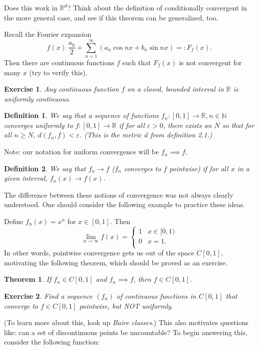 \documentclass{article}
\newtheorem{thm}{Theorem}[section]
\newtheorem{defn}{Definition}[section]
\newtheorem{exer}{Exercise}[section]
\begin{document}
Does this work in $\mathbb{R}^d$? Think about the definition of conditionally convergent in the more general case, and see if this theorem can be generalized, too. 

Recall the Fourier expansion
\begin{equation}
    f(x) ~ \frac{a_{0}}{2} + \sum_{n=1}^{\infty} (a_{n}\cos nx + b_{n}\sin nx) =: F_{f}(x).
\end{equation}
Then there are continuous functions $f$ such that $F_{f}(x)$ is not convergent for many $x$ (try to verify this). 

\begin{exer}
Any continuous function $f$ on a closed, bounded interval in $\mathbb{R}$ is uniformly continuous.
\end{exer}

\begin{defn}
We say that a sequence of functions $f_{n} : [0,1] \to \mathbb{R}, n \in \mathbb{N}$ converges uniformly to $f : [0,1] \to \mathbb{R}$ if for all $\varepsilon > 0$, there exists an $N$ so that for all $n \geq N$, $d(f_{n}, f) < \varepsilon$. (This is the metric $d$ from definition 2.1.)
\end{defn}
Note: our notation for uniform convergence will be $f_{n} \implies f$. 

\begin{defn}
We say that $f_{n} \rightarrow f$ ($f_{n}$ converges to $f$ pointwise) if for all $x$ in a given interval, $f_{n}(x) \rightarrow f(x)$.
\end{defn}
The difference between these notions of convergence was not always clearly understood. One should consider the following example to practice these ideas.

Define $f_{n}(x) = x^{n}$ for $x \in [0,1]$. Then
\[ \lim_{n \rightarrow \infty} f(x) =   \left\{
\begin{array}{ll}
      1 &  x \in [0,1) \\
      0 &  x=1 .  \\
\end{array} 
\right. \]
In other words, pointwise convergence gets us out of the space $C[0,1]$, motivating the following theorem, which should be proved as an exercise.

\begin{thm}
If $f_{n} \in C[0,1]$ and $f_{n} \implies f$, then $f \in C[0,1]$.
\end{thm}

\begin{exer}
Find a sequence $(f_{n})$ of continuous functions in $C[0,1]$ that converge to $f \in C[0,1]$ pointwise, but NOT uniformly.
\end{exer}
(To learn more about this, look up \textit{Baire classes}.) This also motivates questions like: can a set of discontinuous points be uncountable? To begin answering this, consider the following function:
\end{document}
